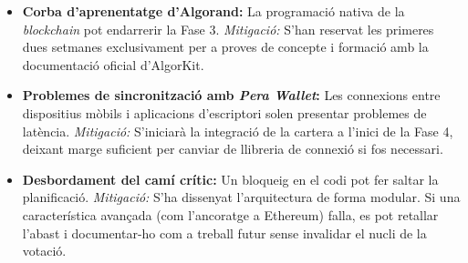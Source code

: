 \begin{itemize}
    \item \textbf{Corba d'aprenentatge d'Algorand:} La programació nativa de la \textit{blockchain} pot endarrerir la Fase 3. \textit{Mitigació:} S'han reservat les primeres dues setmanes exclusivament per a proves de concepte i formació amb la documentació oficial d'AlgorKit.
    \item \textbf{Problemes de sincronització amb \textit{Pera Wallet}:} Les connexions entre dispositius mòbils i aplicacions d'escriptori solen presentar problemes de latència. \textit{Mitigació:} S'iniciarà la integració de la cartera a l'inici de la Fase 4, deixant marge suficient per canviar de llibreria de connexió si fos necessari.
    \item \textbf{Desbordament del camí crític:} Un bloqueig en el codi pot fer saltar la planificació. \textit{Mitigació:} S'ha dissenyat l'arquitectura de forma modular. Si una característica avançada (com l'ancoratge a Ethereum) falla, es pot retallar l'abast i documentar-ho com a treball futur sense invalidar el nucli de la votació.
\end{itemize}








